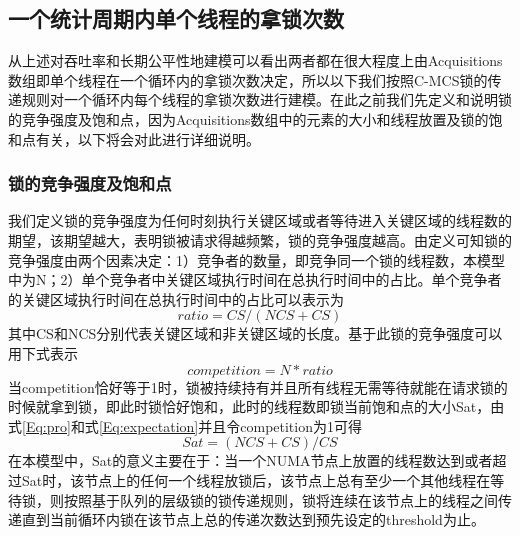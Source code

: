 \subsection{一个统计周期内单个线程的拿锁次数}
从上述对吞吐率和长期公平性地建模可以看出两者都在很大程度上由Acquisitions数组即单个线程在一个循环内的拿锁次数决定，所以以下我们按照C-MCS锁的传递规则对一个循环内每个线程的拿锁次数进行建模。在此之前我们先定义和说明锁的竞争强度及饱和点，因为Acquisitions数组中的元素的大小和线程放置及锁的饱和点有关，以下将会对此进行详细说明。

\subsubsection{锁的竞争强度及饱和点}
我们定义锁的竞争强度为任何时刻执行关键区域或者等待进入关键区域的线程数的期望，该期望越大，表明锁被请求得越频繁，锁的竞争强度越高。由定义可知锁的竞争强度由两个因素决定：1）竞争者的数量，即竞争同一个锁的线程数，本模型中为N；2）单个竞争者中关键区域执行时间在总执行时间中的占比。单个竞争者的关键区域执行时间在总执行时间中的占比可以表示为
\begin{equation}\label{Eq:pro}
     ratio = CS / (NCS + CS)
\end{equation}
其中CS和NCS分别代表关键区域和非关键区域的长度。基于此锁的竞争强度可以用下式表示
\begin{equation}\label{Eq:expectation}
     competition = N * ratio
\end{equation}
当competition恰好等于1时，锁被持续持有并且所有线程无需等待就能在请求锁的时候就拿到锁，即此时锁恰好饱和\cite{dice2017malthusian}，此时的线程数即锁当前饱和点的大小Sat，由式\ref{Eq:pro}和式\ref{Eq:expectation}并且令competition为1可得
\begin{equation}\label{Eq:sat}
     Sat = (NCS + CS) / CS
\end{equation}
在本模型中，Sat的意义主要在于：当一个NUMA节点上放置的线程数达到或者超过Sat时，该节点上的任何一个线程放锁后，该节点上总有至少一个其他线程在等待锁，则按照基于队列的层级锁的锁传递规则，锁将连续在该节点上的线程之间传递直到当前循环内锁在该节点上总的传递次数达到预先设定的threshold为止。


